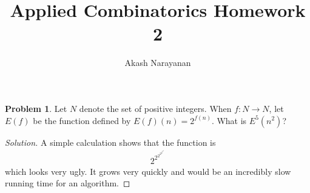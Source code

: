 \documentclass[12pt]{article}
\title{Applied Combinatorics Homework 2}
\author{Akash Narayanan}
\theoremstyle{definition}
\newtheorem{problem-internal}{Problem}[]
\newenvironment{problem}{
  \medskip
  \begin{problem-internal}
}{
\end{problem-internal}
}
\newenvironment{solution}{
  \begin{proof}[Solution]
    \vspace{-8px}
    \setlength{\parskip}{4px}
    \setlength{\parindent}{0px}
}{
\end{proof}
}
\begin{document}
  \maketitle

  \begin{problem}
    Let \(N\) denote the set of positive integers. When \(f : N \rightarrow N \), let \(E(f)\) be the function defined by \(E(f)(n) = 2^{f(n)}\). What is \(E^{5}(n^2)\)?
  \end{problem}

  \begin{solution}
    A simple calculation shows that the function is
    \begin{align*}
      2^{2^{2^{2^{2^{n^{2}}}}}}
    \end{align*}
    which looks very ugly. It grows very quickly and would be an incredibly slow running time for an algorithm.
  \end{solution}
\end{document}
